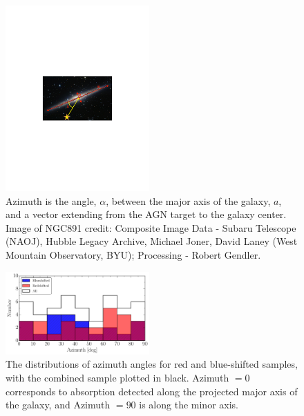 \documentclass[twocolumn,tighten]{aastex6}
\begin{document}
\begin{figure}[ht!]
        \centering
        \includegraphics[width=0.49\textwidth]{fig11.pdf}
        \caption{\small{Azimuth is the angle, $\alpha$, between the major axis of the galaxy, $a$, and a vector extending from the AGN target to the galaxy center. Image of NGC891 credit: Composite Image Data - Subaru Telescope (NAOJ), Hubble Legacy Archive, Michael Joner, David Laney (West Mountain Observatory, BYU); Processing - Robert Gendler.}}
        \label{azimuth_illustration}
        \vspace{5pt}
\end{figure} 

\begin{figure}[ht!]
        \centering
        \includegraphics[width=0.49\textwidth]{fig12.pdf}
        \caption{\small{The distributions of azimuth angles for red and blue-shifted samples, with the combined sample plotted in black. Azimuth $= 0$ corresponds to absorption detected along the projected major axis of the galaxy, and Azimuth $= 90$ is along the minor axis.}}
        \label{azimuth_dist}
        \vspace{5pt}
\end{figure}
\end{document}
